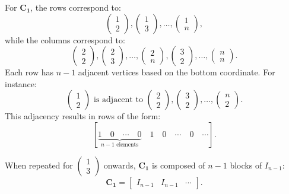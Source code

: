 \documentclass{article}
\begin{document}
For \( \mathbf{C_1} \), the rows correspond to:
\[
\begin{pmatrix} 1 \\ 2 \end{pmatrix}, \begin{pmatrix} 1 \\ 3 \end{pmatrix}, \dots, \begin{pmatrix} 1 \\ n \end{pmatrix},
\]
while the columns correspond to:
\[
\begin{pmatrix} 2 \\ 2 \end{pmatrix}, \begin{pmatrix} 2 \\ 3 \end{pmatrix}, \dots, \begin{pmatrix} 2 \\ n \end{pmatrix}, \begin{pmatrix} 3 \\ 2 \end{pmatrix}, \dots, \begin{pmatrix} n \\ n \end{pmatrix}.
\]
Each row has \( n-1 \) adjacent vertices based on the bottom coordinate. For instance:
\[
\begin{pmatrix} 1 \\ 2 \end{pmatrix} \text{ is adjacent to } \begin{pmatrix} 2 \\ 2 \end{pmatrix}, \begin{pmatrix} 3 \\ 2 \end{pmatrix}, \dots, \begin{pmatrix} n \\ 2 \end{pmatrix}.
\]
This adjacency results in rows of the form:
\[
[\underbrace{1 \quad 0 \quad \cdots \quad 0}_{n-1 \text{ elements}} \quad 1 \quad 0 \quad \cdots \quad 0 \quad \cdots].
\]

When repeated for \( \begin{pmatrix} 1 \\ 3 \end{pmatrix} \) onwards, \( \mathbf{C_1} \) is composed of \( n-1 \) blocks of \( I_{n-1} \):
\[
\mathbf{C_1} = 
\begin{bmatrix}
I_{n-1} & I_{n-1} & \cdots
\end{bmatrix}.
\]
\end{document}
